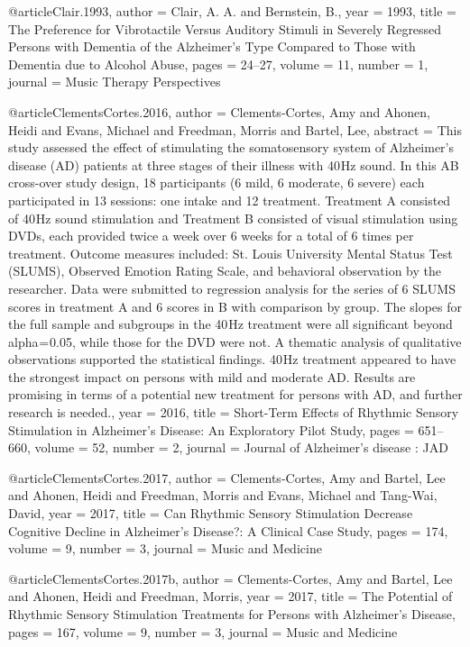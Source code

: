 @article{Clair.1993,
 author = {Clair, A. A. and Bernstein, B.},
 year = {1993},
 title = {{The Preference for Vibrotactile Versus Auditory Stimuli in Severely Regressed Persons with Dementia of the Alzheimer's Type Compared to Those with Dementia due to Alcohol Abuse}},
 pages = {24--27},
 volume = {11},
 number = {1},
 journal = {{Music Therapy Perspectives}}
}


@article{ClementsCortes.2016,
 author = {Clements-Cortes, Amy and Ahonen, Heidi and Evans, Michael and Freedman, Morris and Bartel, Lee},
 abstract = {This study assessed the effect of stimulating the somatosensory system of Alzheimer's disease (AD) patients at three stages of their illness with 40 Hz sound. In this AB cross-over study design, 18 participants (6 mild, 6 moderate, 6 severe) each participated in 13 sessions: one intake and 12 treatment. Treatment A consisted of 40 Hz sound stimulation and Treatment B consisted of visual stimulation using DVDs, each provided twice a week over 6 weeks for a total of 6 times per treatment. Outcome measures included: St. Louis University Mental Status Test (SLUMS), Observed Emotion Rating Scale, and behavioral observation by the researcher. Data were submitted to regression analysis for the series of 6 SLUMS scores in treatment A and 6 scores in B with comparison by group. The slopes for the full sample and subgroups in the 40 Hz treatment were all significant beyond alpha = 0.05, while those for the DVD were not. A thematic analysis of qualitative observations supported the statistical findings. 40 Hz treatment appeared to have the strongest impact on persons with mild and moderate AD. Results are promising in terms of a potential new treatment for persons with AD, and further research is needed.},
 year = {2016},
 title = {{Short-Term Effects of Rhythmic Sensory Stimulation in Alzheimer's Disease: An Exploratory Pilot Study}},
 pages = {651--660},
 volume = {52},
 number = {2},
 journal = {{Journal of Alzheimer's disease : JAD}}
}


@article{ClementsCortes.2017,
 author = {Clements-Cortes, Amy and Bartel, Lee and Ahonen, Heidi and Freedman, Morris and Evans, Michael and Tang-Wai, David},
 year = {2017},
 title = {{Can Rhythmic Sensory Stimulation Decrease Cognitive Decline in Alzheimer's Disease?: A Clinical Case Study}},
 pages = {174},
 volume = {9},
 number = {3},
 journal = {{Music and Medicine}}
}


@article{ClementsCortes.2017b,
 author = {Clements-Cortes, Amy and Bartel, Lee and Ahonen, Heidi and Freedman, Morris},
 year = {2017},
 title = {{The Potential of Rhythmic Sensory Stimulation Treatments for Persons with Alzheimer's Disease}},
 pages = {167},
 volume = {9},
 number = {3},
 journal = {{Music and Medicine}}
}


